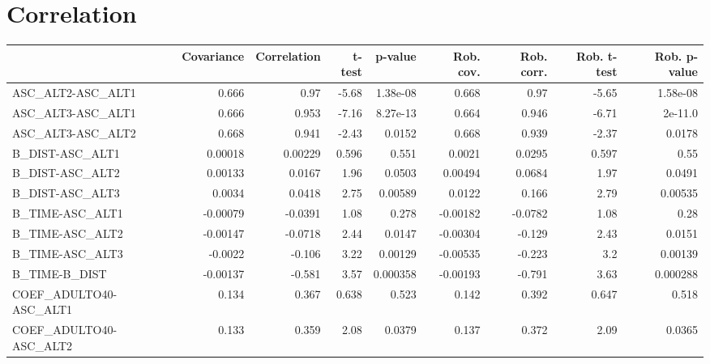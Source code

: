 \section{Correlation}
\begin{tabular}{lrrrrrrrr}
\toprule
{} &  Covariance &  Correlation &  t-test &  p-value &  Rob. cov. &  Rob. corr. &  Rob. t-test &  Rob. p-value \\
\midrule
ASC\_ALT2-ASC\_ALT1                 &       0.666 &         0.97 &   -5.68 & 1.38e-08 &      0.668 &        0.97 &        -5.65 &      1.58e-08 \\
ASC\_ALT3-ASC\_ALT1                 &       0.666 &        0.953 &   -7.16 & 8.27e-13 &      0.664 &       0.946 &        -6.71 &       2e-11.0 \\
ASC\_ALT3-ASC\_ALT2                 &       0.668 &        0.941 &   -2.43 &   0.0152 &      0.668 &       0.939 &        -2.37 &        0.0178 \\
B\_DIST-ASC\_ALT1                   &     0.00018 &      0.00229 &   0.596 &    0.551 &     0.0021 &      0.0295 &        0.597 &          0.55 \\
B\_DIST-ASC\_ALT2                   &     0.00133 &       0.0167 &    1.96 &   0.0503 &    0.00494 &      0.0684 &         1.97 &        0.0491 \\
B\_DIST-ASC\_ALT3                   &      0.0034 &       0.0418 &    2.75 &  0.00589 &     0.0122 &       0.166 &         2.79 &       0.00535 \\
B\_TIME-ASC\_ALT1                   &    -0.00079 &      -0.0391 &    1.08 &    0.278 &   -0.00182 &     -0.0782 &         1.08 &          0.28 \\
B\_TIME-ASC\_ALT2                   &    -0.00147 &      -0.0718 &    2.44 &   0.0147 &   -0.00304 &      -0.129 &         2.43 &        0.0151 \\
B\_TIME-ASC\_ALT3                   &     -0.0022 &       -0.106 &    3.22 &  0.00129 &   -0.00535 &      -0.223 &          3.2 &       0.00139 \\
B\_TIME-B\_DIST                     &    -0.00137 &       -0.581 &    3.57 & 0.000358 &   -0.00193 &      -0.791 &         3.63 &      0.000288 \\
COEF\_ADULTO40-ASC\_ALT1            &       0.134 &        0.367 &   0.638 &    0.523 &      0.142 &       0.392 &        0.647 &         0.518 \\
COEF\_ADULTO40-ASC\_ALT2            &       0.133 &        0.359 &    2.08 &   0.0379 &      0.137 &       0.372 &         2.09 &        0.0365 \\

\end{tabular}
